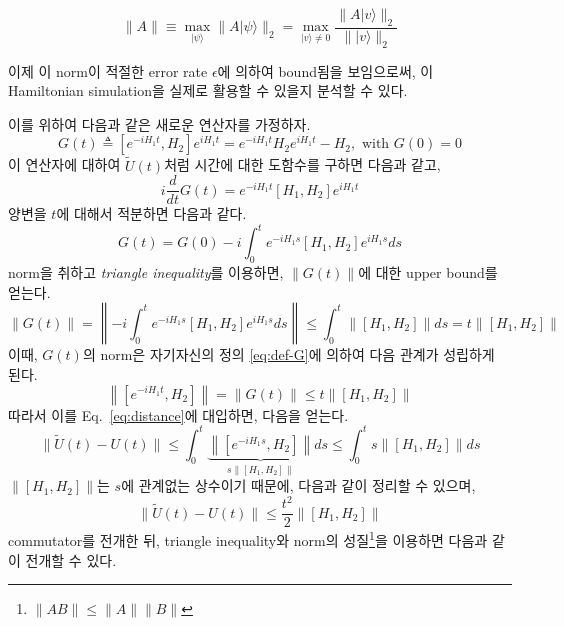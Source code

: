 \begin{definition}
  $$  \|A\| \equiv \max _{|\psi\rangle} \| A|\psi\rangle \|_2=\max _{|v\rangle \ne 0} \frac{\| A|v \rangle \|_2}{\||v\rangle \|_2} $$
\end{definition}

이제 이 norm이 적절한 error rate $\epsilon$에 의하여 bound됨을 보임으로써, 이 Hamiltonian simulation을 실제로 활용할 수 있을지 분석할 수 있다. 

\newpage 
이를 위하여 다음과 같은 새로운 연산자를 가정하자.
\begin{equation}
  G(t) \triangleq [e^{-iH_1t}, H_2] e^{iH_1t} = e^{-i H_1t} H_2 e^{iH_1t} - H_2, \text{ with } G(0) = 0 \label{eq:def-G}
\end{equation}
이 연산자에 대하여 $\tilde U(t)$처럼 시간에 대한 도함수를 구하면 다음과 같고,
\begin{equation*}
  i \frac{d}{d t} G(t)=e^{-i H_1 t}\left[H_1, H_2\right] e^{i H_1 t}
\end{equation*}
양변을 $t$에 대해서 적분하면 다음과 같다. 
\begin{equation*}
  G(t)=G(0) - i \int_{0}^{t} e^{-i H_1 s}\left[H_1, H_2\right] e^{i H_1 s} ds 
\end{equation*}
norm을 취하고 \textit{triangle inequality}를 이용하면, $\|G(t)\|$에 대한 upper bound를 얻는다.
\begin{equation}
  \|G(t) \|=  \left\| -i \int^t_0 e^{-i H_1 s}\left[H_1, H_2\right] e^{i H_1 s} ds \right\| \le \int^t_0 \|\left[H_1, H_2\right]\| ds = t \|\left[H_1, H_2\right]\| \label{eq:G-bound}
\end{equation}
이때, $G(t)$의 norm은 자기자신의 정의 \eqref{eq:def-G}에 의하여 다음 관계가 성립하게 된다.
\begin{equation*}
  \left\|\left[e^{-i H_1 t}, H_2\right]\right\|=\|G(t)\| \leq t\left\|\left[H_1, H_2\right]\right\| 
\end{equation*}
따라서 이를 Eq.~\eqref{eq:distance}에 대입하면, 다음을 얻는다.
\begin{equation*}
  \|\tilde{U}(t)-U(t)\|  \leq \int_0^t \underbrace{\left\|\left[e^{-i H_1 s}, H_2\right]\right\|}_{s\|[H_1, H_2]\|} d s  \leq \int^t_0 s\left\|\left[H_1, H_2\right]\right\|  ds  
\end{equation*}
$\|[H_1, H_2]\|$는 $s$에 관계없는 상수이기 때문에, 다음과 같이 정리할 수 있으며, 
\begin{equation*}
  \|\tilde{U}(t)-U(t)\| \leq \frac{t^2}{2} \left\|\left[H_1, H_2\right]\right\|
\end{equation*}
commutator를 전개한 뒤, triangle inequality와 norm의 성질\footnote{$\|AB\| \le \|A\| \|B\|$}을 이용하면 다음과 같이 전개할 수 있다.
